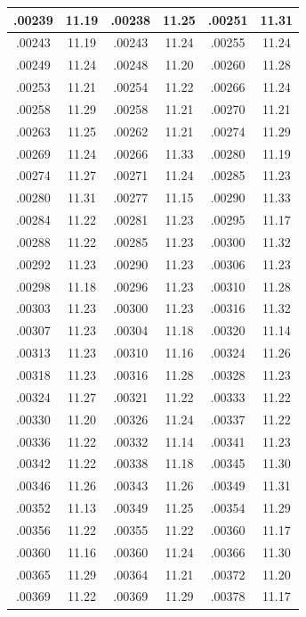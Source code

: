 \documentclass[10pt,twoside]{report}
\begin{document}
\begin{appendices}
\begin{longtable}{|c|c||c|c||c|c|}
.00239 & 11.19 & .00238 & 11.25 & .00251 & 11.31\\\hline
.00243 & 11.19 & .00243 & 11.24 & .00255 & 11.24\\\hline
.00249 & 11.24 & .00248 & 11.20 & .00260 & 11.28\\\hline
.00253 & 11.21 & .00254 & 11.22 & .00266 & 11.24\\\hline
.00258 & 11.29 & .00258 & 11.21 & .00270 & 11.21\\\hline
.00263 & 11.25 & .00262 & 11.21 & .00274 & 11.29\\\hline
.00269 & 11.24 & .00266 & 11.33 & .00280 & 11.19\\\hline
.00274 & 11.27 & .00271 & 11.24 & .00285 & 11.23\\\hline
.00280 & 11.31 & .00277 & 11.15 & .00290 & 11.33\\\hline
.00284 & 11.22 & .00281 & 11.23 & .00295 & 11.17\\\hline
.00288 & 11.22 & .00285 & 11.23 & .00300 & 11.32\\\hline
.00292 & 11.23 & .00290 & 11.23 & .00306 & 11.23\\\hline
.00298 & 11.18 & .00296 & 11.23 & .00310 & 11.28\\\hline
.00303 & 11.23 & .00300 & 11.23 & .00316 & 11.32\\\hline
.00307 & 11.23 & .00304 & 11.18 & .00320 & 11.14\\\hline
.00313 & 11.23 & .00310 & 11.16 & .00324 & 11.26\\\hline
.00318 & 11.23 & .00316 & 11.28 & .00328 & 11.23\\\hline
.00324 & 11.27 & .00321 & 11.22 & .00333 & 11.22\\\hline
.00330 & 11.20 & .00326 & 11.24 & .00337 & 11.22\\\hline
.00336 & 11.22 & .00332 & 11.14 & .00341 & 11.23\\\hline
.00342 & 11.22 & .00338 & 11.18 & .00345 & 11.30\\\hline
.00346 & 11.26 & .00343 & 11.26 & .00349 & 11.31\\\hline
.00352 & 11.13 & .00349 & 11.25 & .00354 & 11.29\\\hline
.00356 & 11.22 & .00355 & 11.22 & .00360 & 11.17\\\hline
.00360 & 11.16 & .00360 & 11.24 & .00366 & 11.30\\\hline
.00365 & 11.29 & .00364 & 11.21 & .00372 & 11.20\\\hline
.00369 & 11.22 & .00369 & 11.29 & .00378 & 11.17\\\hline

\end{longtable}
\end{appendices}
\end{document}
